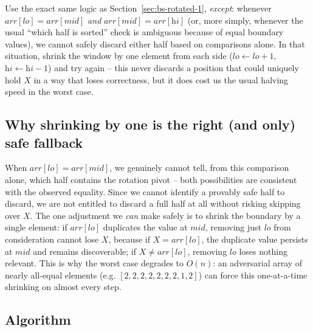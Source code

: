 \begin{ideabox}
Use the exact same logic as Section~\ref{sec:bs-rotated-1}, \emph{except}:
whenever $\textit{arr}[\textit{lo}] = \textit{arr}[\textit{mid}]$ \emph{and}
$\textit{arr}[\textit{mid}] = \textit{arr}[\textit{hi}]$ (or, more simply,
whenever the usual ``which half is sorted'' check is ambiguous because of
equal boundary values), we cannot safely discard either half based on
comparisons alone. In that situation, shrink the window by one element from
each side ($\textit{lo} \gets \textit{lo}+1$, $\textit{hi} \gets
\textit{hi}-1$) and try again -- this never discards a position that could
uniquely hold $X$ in a way that loses correctness, but it does cost us the
usual halving speed in the worst case.
\end{ideabox}

\subsection*{Why shrinking by one is the right (and only) safe fallback}

When $\textit{arr}[\textit{lo}] = \textit{arr}[\textit{mid}]$, we genuinely
cannot tell, from this comparison alone, which half contains the rotation
pivot -- both possibilities are consistent with the observed equality. Since
we cannot identify a provably safe half to discard, we are not entitled to
discard a full half at all without risking skipping over $X$. The one
adjustment we \emph{can} make safely is to shrink the boundary by a single
element: if $\textit{arr}[\textit{lo}]$ duplicates the value at
$\textit{mid}$, removing just $\textit{lo}$ from consideration cannot lose
$X$, because if $X = \textit{arr}[\textit{lo}]$, the duplicate value
persists at $\textit{mid}$ and remains discoverable; if $X \ne
\textit{arr}[\textit{lo}]$, removing $\textit{lo}$ loses nothing relevant.
This is why the worst case degrades to $O(n)$: an adversarial array of
nearly all-equal elements (e.g. $[2,2,2,2,2,2,2,1,2]$) can force this
one-at-a-time shrinking on almost every step.

\subsection*{Algorithm}

